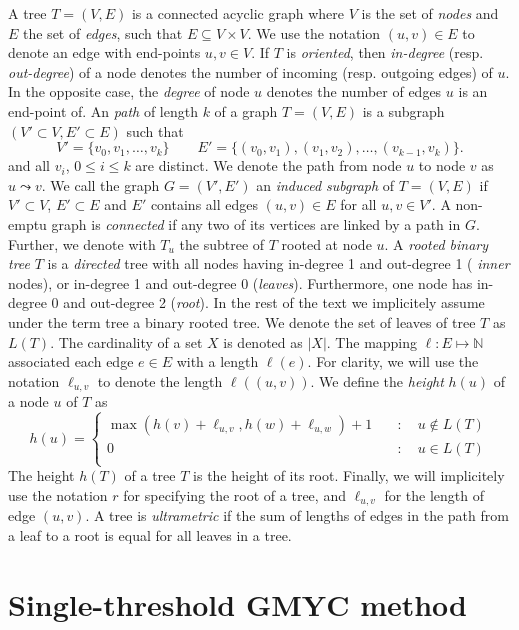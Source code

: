\documentclass{llncs}
\begin{document}
A tree $T=(V,E)$ is a connected acyclic graph where $V$ is the set of {\em
nodes} and $E$ the set of {\em edges}, such that $E \subseteq V\times V$. We
use the notation $(u,v) \in E$ to denote an edge with end-points $u,v \in V$.
If $T$ is {\em oriented}, then {\em in-degree} (resp. {\em out-degree}) of a
node denotes the number of incoming (resp. outgoing edges) of $u$. In the
opposite case, the {\em degree} of node $u$ denotes the number of edges $u$ is
an end-point of. An {\em path} of length $k$ of a graph
$T=(V,E)$ is a subgraph $(V' \subset V,E' \subset E)$ such that 
\[ V' = \{v_0,v_1,\ldots, v_k\} \qquad 
E' =\{(v_0,v_1),(v_1,v_2),\ldots,(v_{k-1},v_k)\}. \] 
and all $v_i$, $0 \leq i \leq k$ are distinct. We denote the path from node $u$
to node $v$ as $u \leadsto v$. We call the graph $G=(V',E')$ an {\em induced
subgraph} of $T=(V,E)$ if $V'\subset V$, $E' \subset E$ and $E'$ contains all
edges $(u,v) \in E$ for all $u,v\in V'$.  A non-emptu graph is {\em connected}
if any two of its vertices are linked by a path in $G$. Further, we denote with
$T_u$ the subtree of $T$ rooted at node $u$.  A {\em rooted binary tree} $T$ is
a {\em directed} tree with all nodes having in-degree 1 and out-degree 1 ({\em
inner} nodes), or in-degree 1 and out-degree 0 ({\em leaves}). Furthermore, one
node has in-degree 0 and out-degree 2 ({\em root}).  In the rest of the text we
implicitely assume under the term tree a binary rooted tree.  We denote the set
of leaves of tree $T$ as $L(T)$.  The cardinality of a set $X$ is denoted as
$|X|$. The mapping $\ell : E \mapsto \mathbb{N}$ associated each edge $e \in E$
with a length $\ell(e)$.  For clarity, we will use the notation $\ell_{u,v}$ to
denote the length $\ell((u,v))$.  We define the {\em height} $h(u)$ of a node
$u$ of $T$ as
%
\[ h(u) = \left\{ \begin{array}{ll} \max(h(v) + \ell_{u,v}, h(w) + \ell_{u,w})
+ 1 & \quad : \quad u \notin L(T)\\ 0
& \quad : \quad u    \in L(T)\\ \end{array}\right. \] The height $h(T)$ of a
tree $T$ is the height of its root. Finally, we will implicitely use the
notation $r$ for specifying the root of a tree, and $\ell_{u,v}$ for the length
of edge $(u,v)$.  A tree is {\em ultrametric} if the sum of lengths of edges in
the path from a leaf to a root is equal for all leaves in a tree.

\section{Single-threshold GMYC method}
\end{document}
